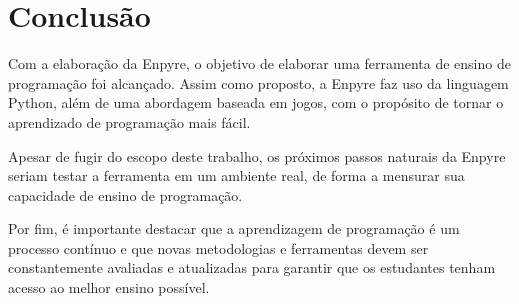 \chapter[Conclusão]{Conclusão}

Com a elaboração da Enpyre, o objetivo de elaborar uma ferramenta de ensino de programação foi alcançado. Assim como proposto, a Enpyre faz uso da linguagem Python, além de uma abordagem baseada em jogos, com o propósito de tornar o aprendizado de programação mais fácil.

Apesar de fugir do escopo deste trabalho, os próximos passos naturais da Enpyre seriam testar a ferramenta em um ambiente real, de forma a mensurar sua capacidade de ensino de programação.

Por fim, é importante destacar que a aprendizagem de programação é um processo contínuo e que novas metodologias e ferramentas devem ser constantemente avaliadas e atualizadas para garantir que os estudantes tenham acesso ao melhor ensino possível.
